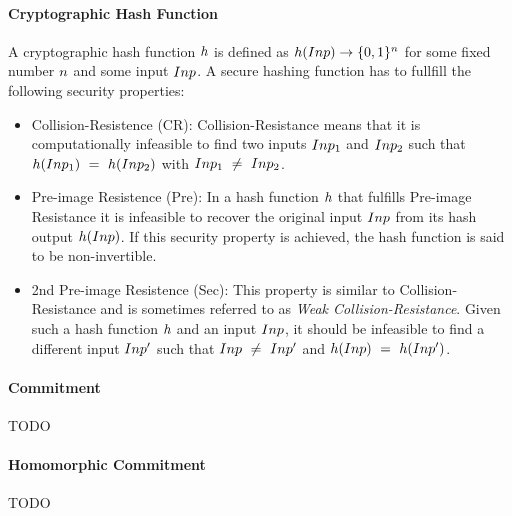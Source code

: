 \paragraph{Cryptographic Hash Function}
A cryptographic hash function $h$ is defined as $h (Inp) \rightarrow \{0,1\}^{n}$ for some fixed number $n$ and some input $Inp$. A secure hashing function
has to fullfill the following security properties:~\cite{al2011cryptographic}
\begin{itemize}
    \item Collision-Resistence (CR): Collision-Resistance means that it is computationally infeasible to find two inputs $Inp_1$ and $Inp_2$ such that
    $h (Inp_1) ~=~ h (Inp_2)$ with $Inp_1 ~\neq~ Inp_2$.
    \item Pre-image Resistence (Pre): In a hash function $h$ that fulfills Pre-image Resistance it is infeasible to recover the original input $Inp$ from its hash output $h (Inp)$.
    If this security property is achieved, the hash function is said to be non-invertible.
    \item 2nd Pre-image Resistence (Sec):  This property is similar to Collision-Resistance and is sometimes referred to as \textit{Weak Collision-Resistance}.
    Given such a hash function $h$ and an input $Inp$, it should be infeasible to find a different input $Inp'$ such that $Inp ~\neq~ Inp'$
    and $h (Inp) ~=~ h (Inp')$.
\end{itemize}

\paragraph{Commitment}
TODO
\paragraph{Homomorphic Commitment}
TODO

